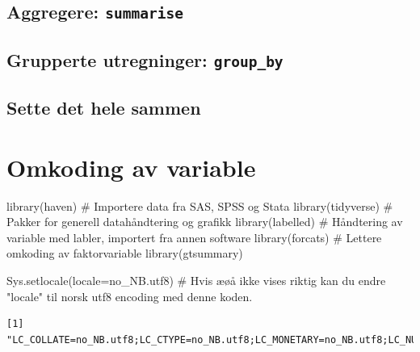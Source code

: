 \documentclass[
  letterpaper,
  DIV=11,
  numbers=noendperiod]{scrreprt}
\newenvironment{Shaded}{\begin{snugshade}}{\end{snugshade}}
\newcommand{\AttributeTok}[1]{\textcolor[rgb]{0.40,0.45,0.13}{#1}}
\newcommand{\CommentTok}[1]{\textcolor[rgb]{0.37,0.37,0.37}{#1}}
\newcommand{\FunctionTok}[1]{\textcolor[rgb]{0.28,0.35,0.67}{#1}}
\newcommand{\NormalTok}[1]{\textcolor[rgb]{0.00,0.23,0.31}{#1}}
\newcommand{\StringTok}[1]{\textcolor[rgb]{0.13,0.47,0.30}{#1}}
\theoremstyle{definition}
\theoremstyle{remark}
\begin{document}
\hypertarget{aggregere-summarise}{%
\section{\texorpdfstring{Aggregere:
\texttt{summarise}}{Aggregere: summarise}}\label{aggregere-summarise}}

\hypertarget{grupperte-utregninger-group_by}{%
\section{\texorpdfstring{Grupperte utregninger:
\texttt{group\_by}}{Grupperte utregninger: group\_by}}\label{grupperte-utregninger-group_by}}

\hypertarget{sette-det-hele-sammen}{%
\section{Sette det hele sammen}\label{sette-det-hele-sammen}}

\hypertarget{omkoding-av-variable}{%
\chapter{Omkoding av variable}\label{omkoding-av-variable}}

\begin{Shaded}
\begin{Highlighting}[]
\FunctionTok{library}\NormalTok{(haven)       }\CommentTok{\# Importere data fra SAS, SPSS og Stata}
\FunctionTok{library}\NormalTok{(tidyverse)   }\CommentTok{\# Pakker for generell datahåndtering og grafikk}
\FunctionTok{library}\NormalTok{(labelled)    }\CommentTok{\# Håndtering av variable med labler, importert fra annen software}
\FunctionTok{library}\NormalTok{(forcats)     }\CommentTok{\# Lettere omkoding av faktorvariable}
\FunctionTok{library}\NormalTok{(gtsummary)}

\FunctionTok{Sys.setlocale}\NormalTok{(}\AttributeTok{locale=}\StringTok{\textquotesingle{}no\_NB.utf8\textquotesingle{}}\NormalTok{)  }\CommentTok{\# Hvis æøå ikke vises riktig kan du endre "locale" til norsk utf8 encoding med denne koden. }
\end{Highlighting}
\end{Shaded}

\begin{verbatim}
[1] "LC_COLLATE=no_NB.utf8;LC_CTYPE=no_NB.utf8;LC_MONETARY=no_NB.utf8;LC_NUMERIC=C;LC_TIME=no_NB.utf8"
\end{verbatim}
\end{document}
